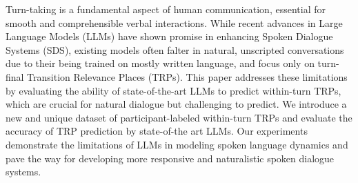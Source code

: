 Turn-taking is a fundamental aspect of human communication, essential for smooth and comprehensible verbal interactions. While recent advances in Large Language Models (LLMs) have shown promise in enhancing Spoken Dialogue Systems (SDS), existing models often falter in natural, unscripted conversations due to their being trained on mostly written language, and focus only on turn-final Transition Relevance Places (TRPs). This paper addresses these limitations by evaluating the ability of state-of-the-art LLMs to predict within-turn TRPs, which are crucial for natural dialogue but challenging to predict. We introduce a new and unique dataset of participant-labeled within-turn TRPs and evaluate the accuracy of TRP prediction by state-of-the art LLMs. Our experiments demonstrate the limitations of LLMs in modeling spoken language dynamics and pave the way for developing more responsive and naturalistic spoken dialogue systems.